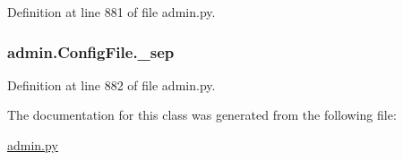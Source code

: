 Definition at line 881 of file admin.\-py.

\hypertarget{classadmin_1_1ConfigFile_a3f7db562c59049e6a3b28b1fdfafa63e}{
\subsubsection[{\-\_\-sep}]{\setlength{\rightskip}{0pt plus 5cm}admin.\-Config\-File.\-\_\-sep\hspace{0.3cm}{\ttfamily [private]}}}\label{classadmin_1_1ConfigFile_a3f7db562c59049e6a3b28b1fdfafa63e}


Definition at line 882 of file admin.\-py.



The documentation for this class was generated from the following file\-:\begin{DoxyCompactItemize}
\item 
\hyperlink{admin_8py}{admin.\-py}\end{DoxyCompactItemize}
